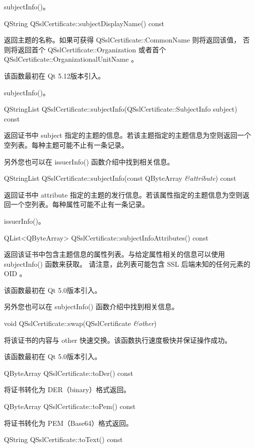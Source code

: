 \begin{seeAlso}
subjectInfo()。
\end{seeAlso}

QString QSslCertificate::subjectDisplayName() const

返回主题的名称。如果可获得 QSslCertificate::CommonName 则将返回该值，
否则将返回首个 QSslCertificate::Organization 
或者首个 QSslCertificate::OrganizationalUnitName 。

该函数最初在 Qt 5.12版本引入。

\begin{seeAlso}
subjectInfo()。
\end{seeAlso}

QStringList QSslCertificate::subjectInfo(QSslCertificate::SubjectInfo subject) const

返回证书中 subject 指定的主题的信息。若该主题指定的主题信息为空则返回一个空列表。每种主题可能不止有一条记录。

另外您也可以在 issuerInfo() 函数介绍中找到相关信息。

QStringList QSslCertificate::subjectInfo(const QByteArray \emph{\&attribute}) const

返回证书中 attribute 指定的主题的发行信息。若该属性指定的主题信息为空则返回一个空列表。每种属性可能不止有一条记录。

\begin{seeAlso}
issuerInfo()。
\end{seeAlso}

QList<QByteArray> QSslCertificate::subjectInfoAttributes() const

返回该证书中包含主题信息的属性列表。与给定属性相关的信息可以使用 subjectInfo() 函数来获取。
请注意，此列表可能包含 SSL 后端未知的任何元素的 OID 。

该函数最初在 Qt 5.0版本引入。

另外您也可以在 subjectInfo() 函数介绍中找到相关信息。

void QSslCertificate::swap(QSslCertificate \emph{\&other})

将该证书的内容与 other 快速交换。该函数执行速度极快并保证操作成功。

该函数最初在 Qt 5.0版本引入。

QByteArray QSslCertificate::toDer() const

将证书转化为 DER（binary）格式返回。

QByteArray QSslCertificate::toPem() const

将证书转化为 PEM（Base64）格式返回。

QString QSslCertificate::toText() const

